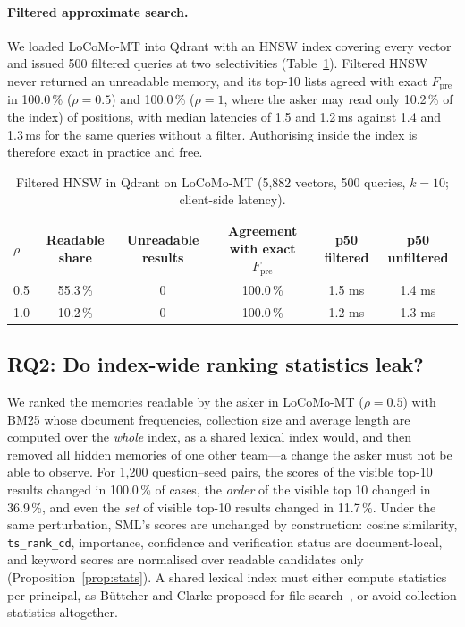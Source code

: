 \documentclass[11pt,a4paper]{article}
\theoremstyle{remark}
\newcommand{\sys}{SML}
\begin{document}
\paragraph{Filtered approximate search.} We loaded LoCoMo-MT into Qdrant with an HNSW index covering every vector and
issued 500 filtered queries at two selectivities (Table~\ref{tab:e3}). Filtered HNSW never returned an unreadable
memory, and its top-10 lists agreed with exact $F_{\mathrm{pre}}$ in 100.0\,\% ($\rho=0.5$) and
100.0\,\% ($\rho=1$, where the asker may read only 10.2\,\% of the index) of
positions, with median latencies of 1.5 and 1.2\,ms against
1.4 and 1.3\,ms for the same queries without a filter.
Authorising inside the index is therefore exact in practice and free.

\begin{table}[htbp]
\centering
\small
\caption{Filtered HNSW in Qdrant on LoCoMo-MT (5{,}882 vectors, 500 queries, $k=10$; client-side latency).}
\label{tab:e3}
\begin{tabular}{@{}lccccc@{}}
\toprule
$\rho$ & Readable share & Unreadable results & Agreement with exact $F_{\mathrm{pre}}$ & p50 filtered & p50 unfiltered \\
\midrule
0.5 & 55.3\,\% & 0 & 100.0\,\% & 1.5 ms & 1.4 ms \\
1.0 & 10.2\,\% & 0 & 100.0\,\% & 1.2 ms & 1.3 ms \\
\bottomrule
\end{tabular}
\end{table}

\subsection{RQ2: Do index-wide ranking statistics leak?}
\label{sec:rq2}

We ranked the memories readable by the asker in LoCoMo-MT ($\rho=0.5$) with BM25 whose document frequencies, collection
size and average length are computed over the \emph{whole} index, as a shared lexical index would, and then removed
all hidden memories of one other team---a change the asker must not be able to observe. For
1{,}200 question--seed pairs, the scores of the visible top-10 results changed in
100.0\,\% of cases, the \emph{order} of the visible top 10 changed in
36.9\,\%, and even the \emph{set} of visible top-10 results changed in
11.7\,\%. Under the same perturbation, \sys{}'s scores are unchanged by construction: cosine
similarity, \texttt{ts\_rank\_cd}, importance, confidence and verification status are document-local, and keyword scores
are normalised over readable candidates only (Proposition~\ref{prop:stats}). A shared lexical index must either compute
statistics per principal, as B{\"u}ttcher and Clarke proposed for file search~\cite{buettcher2005security}, or avoid
collection statistics altogether.
\end{document}
